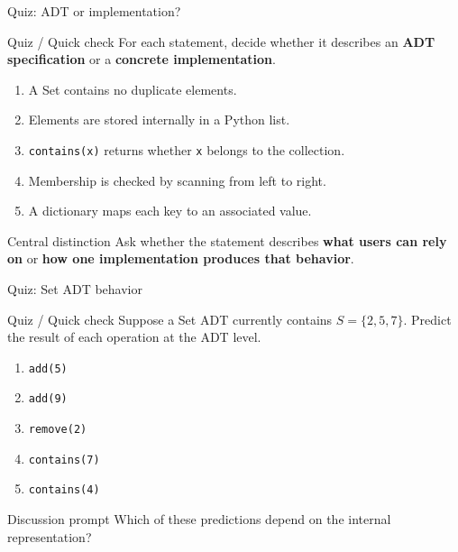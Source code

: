 \documentclass[aspectratio=169]{beamer}
\newcommand{\quizblock}[1]{%
  \begin{alertblock}{Quiz / Quick check}
    #1
  \end{alertblock}
}
\begin{document}
\begin{frame}{Quiz: ADT or implementation?}
\small
\quizblock{For each statement, decide whether it describes an \textbf{ADT specification} or a \textbf{concrete implementation}.}
\vspace{0.3em}
\begin{enumerate}
  \item A Set contains no duplicate elements.
  \item Elements are stored internally in a Python list.
  \item \texttt{contains(x)} returns whether \texttt{x} belongs to the collection.
  \item Membership is checked by scanning from left to right.
  \item A dictionary maps each key to an associated value.
\end{enumerate}
\vspace{0.35em}
\begin{alertblock}{Central distinction}
Ask whether the statement describes \textbf{what users can rely on} or
\textbf{how one implementation produces that behavior}.
\end{alertblock}
\end{frame}

\begin{frame}{Quiz: Set ADT behavior}
\small
\quizblock{Suppose a Set ADT currently contains $S=\{2,5,7\}$. Predict the result of each operation at the ADT level.}
\vspace{0.35em}
\begin{enumerate}
  \item \texttt{add(5)}
  \item \texttt{add(9)}
  \item \texttt{remove(2)}
  \item \texttt{contains(7)}
  \item \texttt{contains(4)}
\end{enumerate}
\vspace{0.35em}
\begin{exampleblock}{Discussion prompt}
Which of these predictions depend on the internal representation?
\end{exampleblock}
\end{frame}
\end{document}
